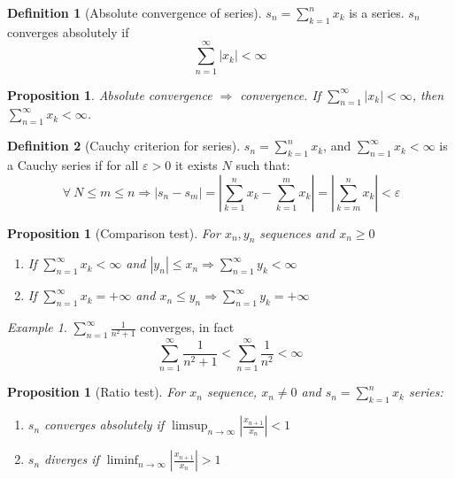 \documentclass{article}
\newcommand{\DS}{\displaystyle}
\newcommand{\abs}[1]{\left|#1\right|}
\newcommand{\Ar}{\Rightarrow}
\newenvironment{enumrom}{\begin{enumerate}[label=(\roman*)]}{\end{enumerate}}
\newcommand{\fr}[2]{\frac{#1}{#2}}
\newcommand{\limsupn}{\limsup_{n \to \infty}}
\newcommand{\liminfn}{\liminf_{n \to \infty}}
\theoremstyle{definition}
\newtheorem{definition}{Definition}[section]
\theoremstyle{definition}
\theoremstyle{plain}
\theoremstyle{plain}
\theoremstyle{plain}
\theoremstyle{plain}
\newtheorem{proposition}[theorem]{Proposition}
\theoremstyle{definition}
\theoremstyle{remark}
\theoremstyle{remark}
\theoremstyle{remark}
\newtheorem{examplet}{Example}[theorem]
\theoremstyle{remark}
\newcommand{\sumn}{\sum_{k=1}^n}
\newcommand{\series}{\sum_{n=1}^\infty}
\newcommand{\ForAll}{\ \forall \ }
\newcommand{\E}{\varepsilon}
\begin{document}
\begin{definition}[Absolute convergence of series]
  $\DS s_n = \sumn{x_k}$ is a series. $s_n$ converges absolutely if
  \[\DS \series{\abs{x_k}} < \infty\]
\end{definition}


\begin{proposition}
  Absolute convergence $\Ar$ convergence. If $\DS \series{\abs{x_k}} < \infty$, then $\DS \series{x_k} < \infty$.
\end{proposition}



\begin{definition}[Cauchy criterion for series]
  $\DS s_n = \sumn{x_k}$, and $\DS \series{x_k} < \infty$ is a Cauchy series if for all $\E > 0$ it exists $N$ such that:
  \[
    \ForAll N \leq m \leq n \Ar \abs{s_n - s_m} =
    \abs{\sumn{x_k} - \sum_{k=1}^m x_k} = \abs{\sum_{k=m}^n x_k} < \E
  \]
\end{definition}


\begin{proposition}[Comparison test]
  For $x_n, y_n$ sequences and $x_n \geq 0$
  \begin{enumrom}
    \item If $\DS \series{x_k} < \infty$ and $\abs{y_n} \leq x_n \DS \Ar \series{y_k} < \infty$
    \item If $\DS \series{x_k} = +\infty$ and $x_n \leq y_n \DS \Ar \series{y_k} = +\infty$
  \end{enumrom}
\end{proposition}


\begin{examplet}
  $\DS \series \fr{1}{n^2+1}$ converges, in fact
  \[
  \series \fr{1}{n^2+1} < \series \fr{1}{n^2} < \infty
  \]
\end{examplet}


\begin{proposition}[Ratio test]
  For $x_n$ sequence, $x_n \neq 0$ and $\DS s_n = \sumn{x_k}$ series:
  \begin{enumrom}
    \item $s_n$ converges absolutely if $\limsupn \abs{\fr{x_{n+1}}{x_n}} < 1$
    \item $s_n$ diverges if $\liminfn \abs{\fr{x_{n+1}}{x_n}} > 1$
  \end{enumrom}
\end{proposition}
\end{document}
